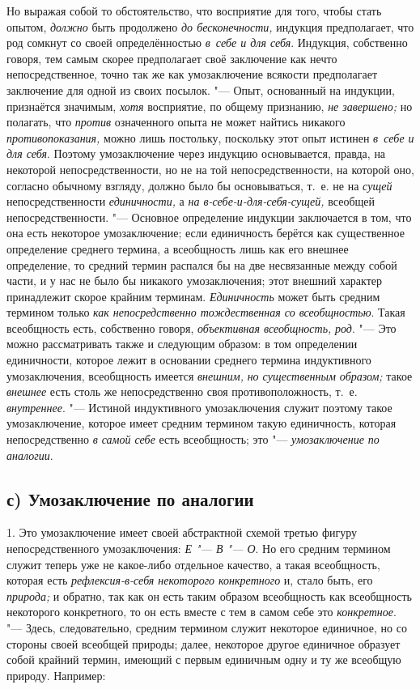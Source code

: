 Но выражая собой то обстоятельство, что восприятие для того,
чтобы стать опытом, {\em должно}
быть продолжено {\em до
бесконечности,} индукция предполагает, что род сомкнут со
своей определённостью {\em в~себе и для
себя}. Индукция, собственно говоря, тем самым скорее
предполагает своё заключение как нечто непосредственное, точно так же как
умозаключение всякости предполагает заключение для одной из своих посылок.
"--- Опыт, основанный на индукции, признаётся значимым,
{\em хотя} восприятие, по
общему признанию, {\em не завершено;}
но полагать, что
{\em против} означенного
опыта не может найтись никакого
{\em противопоказания,}
можно лишь постольку, поскольку этот опыт истинен
{\em в~себе и для себя}.
Поэтому умозаключение через индукцию основывается, правда, на
некоторой непосредственности, но не на той непосредственности, на которой
оно, согласно обычному взгляду, должно было бы основываться, т.~е. не на
{\em сущей}
непосредственности
{\em единичности,} а
{\em на в-себе-и-для-себя-сущей,}
всеобщей непосредственности. "--- Основное
определение индукции заключается в том, что она есть некоторое
умозаключение; если единичность берётся как существенное определение
среднего термина, а всеобщность лишь как его внешнее определение, то
средний термин распался бы на две несвязанные между собой части, и у нас не
было бы никакого умозаключения; этот внешний характер принадлежит скорое
крайним терминам. {\em Единичность}
может быть средним термином только
{\em как непосредственно тождественная
со всеобщностью}. Такая всеобщность есть, собственно говоря,
{\em объективная всеобщность,}
{\em род}. "--- Это можно
рассматривать также и следующим образом: в том определении единичности,
которое лежит в основании среднего термина индуктивного умозаключения,
всеобщность имеется {\em внешним,}
{\em но существенным образом;}
такое {\em внешнее}
есть столь же непосредственно своя противоположность, т.~е.
{\em внутреннее}. "---
Истиной индуктивного умозаключения служит поэтому
такое умозаключение, которое имеет средним термином такую
единичность, которая непосредственно
{\em в самой себе} есть
всеобщность; это "--- {\em умозаключение по
аналогии}.

\subsection[с) Умозаключение по аналогии]{с) Умозаключение по аналогии}

1. Это умозаключение имеет своей абстрактной схемой третью
фигуру непосредственного умозаключения:
{\em Е "--- В
"--- О}. Но его средним термином служит теперь
уже не какое-либо отдельное качество, а такая всеобщность, которая есть
{\em рефлексия-в-себя некоторого
конкретного} и, стало быть, его
{\em природа;} и обратно,
так как он есть таким образом всеобщность как всеобщность некоторого
конкретного, то он есть вместе с тем в самом себе это
{\em конкретное}. "---
Здесь, следовательно, средним термином служит некоторое
единичное, но со стороны своей всеобщей природы; далее, некоторое другое
единичное образует собой крайний термин, имеющий с первым единичным одну и
ту же всеобщую природу. Например:

